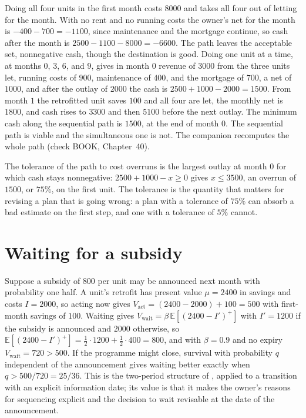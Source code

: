 Doing all four units in the first month costs $8000$ and takes all four out of letting for the month. With no rent and no running costs the owner's net for the month is $-400-700=-1100$, since maintenance and the mortgage continue, so cash after the month is $2500-1100-8000=-6600$. The path leaves the acceptable set, nonnegative cash, though the destination is good. Doing one unit at a time, at months $0$, $3$, $6$, and $9$, gives in month $0$ revenue of $3000$ from the three units let, running costs of $900$, maintenance of $400$, and the mortgage of $700$, a net of $1000$, and after the outlay of $2000$ the cash is $2500+1000-2000=1500$. From month $1$ the retrofitted unit saves $100$ and all four are let, the monthly net is $1800$, and cash rises to $3300$ and then $5100$ before the next outlay. The minimum cash along the sequential path is $1500$, at the end of month $0$. The sequential path is viable and the simultaneous one is not. The companion recomputes the whole path (check BOOK, Chapter~40).

The tolerance of the path to cost overruns is the largest outlay at month $0$ for which cash stays nonnegative: $2500+1000-x\ge 0$ gives $x\le 3500$, an overrun of $1500$, or $75\%$, on the first unit. The tolerance is the quantity that matters for revising a plan that is going wrong: a plan with a tolerance of $75\%$ can absorb a bad estimate on the first step, and one with a tolerance of $5\%$ cannot.

\section{Waiting for a subsidy}

Suppose a subsidy of $800$ per unit may be announced next month with probability one half. A unit's retrofit has present value $\mu=2400$ in savings and costs $I=2000$, so acting now gives $V_{\mathrm{act}}=(2400-2000)+100=500$ with first-month savings of $100$. Waiting gives $V_{\mathrm{wait}}=\beta\,\mathbb E[(2400-I')^+]$ with $I'=1200$ if the subsidy is announced and $2000$ otherwise, so $\mathbb E[(2400-I')^+]=\tfrac12\cdot 1200+\tfrac12\cdot 400=800$, and with $\beta=0.9$ and no expiry $V_{\mathrm{wait}}=720>500$. If the programme might close, survival with probability $q$ independent of the announcement gives waiting better exactly when $q>500/720=25/36$. This is the two-period structure of , applied to a transition with an explicit information date; its value is that it makes the owner's reasons for sequencing explicit and the decision to wait revisable at the date of the announcement.

